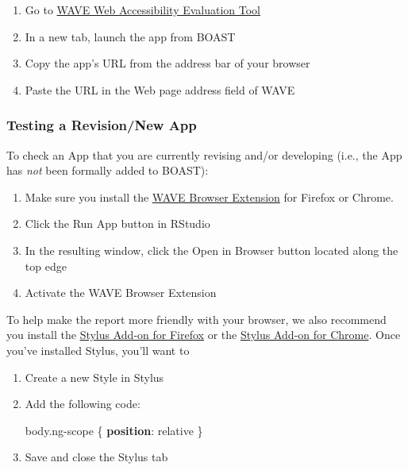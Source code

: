 \documentclass[
]{book}
\newenvironment{Shaded}{\begin{snugshade}}{\end{snugshade}}
\newcommand{\DecValTok}[1]{\textcolor[rgb]{0.00,0.00,0.81}{#1}}
\newcommand{\FunctionTok}[1]{\textcolor[rgb]{0.00,0.00,0.00}{#1}}
\newcommand{\KeywordTok}[1]{\textcolor[rgb]{0.13,0.29,0.53}{\textbf{#1}}}
\newcommand{\NormalTok}[1]{#1}
\providecommand{\tightlist}{%
  \setlength{\itemsep}{0pt}\setlength{\parskip}{0pt}}
\begin{document}
\begin{enumerate}
\def\labelenumi{\arabic{enumi}.}
\tightlist
\item
  Go to \href{https://wave.webaim.org/}{WAVE Web Accessibility Evaluation Tool}
\item
  In a new tab, launch the app from BOAST
\item
  Copy the app's URL from the address bar of your browser
\item
  Paste the URL in the Web page address field of WAVE
\end{enumerate}

\hypertarget{testing-a-revisionnew-app}{%
\subsubsection{Testing a Revision/New App}\label{testing-a-revisionnew-app}}

To check an App that you are currently revising and/or developing (i.e., the App has \emph{not} been formally added to BOAST):

\begin{enumerate}
\def\labelenumi{\arabic{enumi}.}
\tightlist
\item
  Make sure you install the \href{https://wave.webaim.org/extension/}{WAVE Browser Extension} for Firefox or Chrome.
\item
  Click the Run App button in RStudio
\item
  In the resulting window, click the Open in Browser button located along the top edge
\item
  Activate the WAVE Browser Extension
\end{enumerate}

To help make the report more friendly with your browser, we also recommend you install the \href{https://addons.mozilla.org/en-US/firefox/addon/styl-us/}{Stylus Add-on for Firefox} or the \href{https://chrome.google.com/webstore/detail/stylus/clngdbkpkpeebahjckkjfobafhncgmne?hl=en}{Stylus Add-on for Chrome}. Once you've installed Stylus, you'll want to

\begin{enumerate}
\def\labelenumi{\arabic{enumi}.}
\item
  Create a new Style in Stylus
\item
  Add the following code:

\begin{Shaded}
\begin{Highlighting}[]
\NormalTok{body}\FunctionTok{.ng-scope}\NormalTok{ \{}
  \KeywordTok{position}\NormalTok{: }\DecValTok{relative}
\NormalTok{\}}
\end{Highlighting}
\end{Shaded}
\item
  Save and close the Stylus tab
\end{enumerate}
\end{document}
